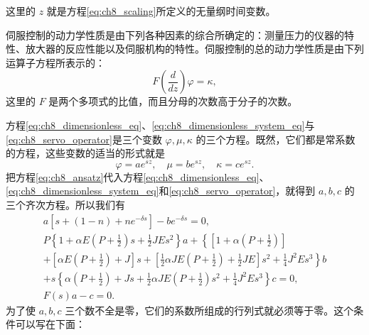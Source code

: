 这里的 $ z $ 就是方程\eqref{eq:ch8_scaling}所定义的无量纲时间变数。

伺服控制的动力学性质是由下列各种因素的综合所确定的：测量压力的仪器的特性、放大器的反应性能以及伺服机构的特性。伺服控制的总的动力学性质是由下列运算子方程所表示的：
\begin{equation}\label{eq:ch8_servo_operator}
F\left(\frac{d}{dz}\right)\varphi = \kappa,
\end{equation}
这里的 $ F $ 是两个多项式的比值，而且分母的次数高于分子的次数。

方程\eqref{eq:ch8_dimensionless_eq}、\eqref{eq:ch8_dimensionless_system_eq}与\eqref{eq:ch8_servo_operator}是三个变数 $ \varphi, \mu, \kappa $ 的三个方程。既然，它们都是常系数的方程，这些变数的适当的形式就是
\begin{equation}\label{eq:ch8_ansatz}
\varphi = ae^{sz}, \quad \mu = be^{sz}, \quad \kappa = ce^{sz}.
\end{equation}
把方程\eqref{eq:ch8_ansatz}代入方程\eqref{eq:ch8_dimensionless_eq}、\eqref{eq:ch8_dimensionless_system_eq}和\eqref{eq:ch8_servo_operator}，就得到 $ a, b, c $ 的三个齐次方程。所以我们有
\begin{equation*}
\begin{array}{l}
a[s + (1 - n) + ne^{-\delta s}] - be^{-\delta s} = 0,\\
P\left\{1 + \alpha E\left(P + \frac{1}{2}\right)s + \frac{1}{2}JEs^2\right\}a + \left\{\left[1 + \alpha\left(P + \frac{1}{2}\right)\right] \right. \\
 + \left[\alpha E\left(P + \frac{1}{2}\right) + J\right]s + \left[\frac{1}{2}\alpha JE\left(P + \frac{1}{2}\right) + \frac{1}{2}JE\right]s^2 + \left. \frac{1}{4}J^2Es^3\right\}b\\
 + s\left\{\alpha\left(P + \frac{1}{2}\right) + Js + \frac{1}{2}\alpha JE\left(P + \frac{1}{2}\right)s^2 + \frac{1}{4}J^2Es^3\right\}c = 0,\\
F(s)a - c = 0.
\end{array}
\end{equation*}
为了使 $ a, b, c $ 三个数不全是零，它们的系数所组成的行列式就必须等于零。这个条件可以写在下面：
